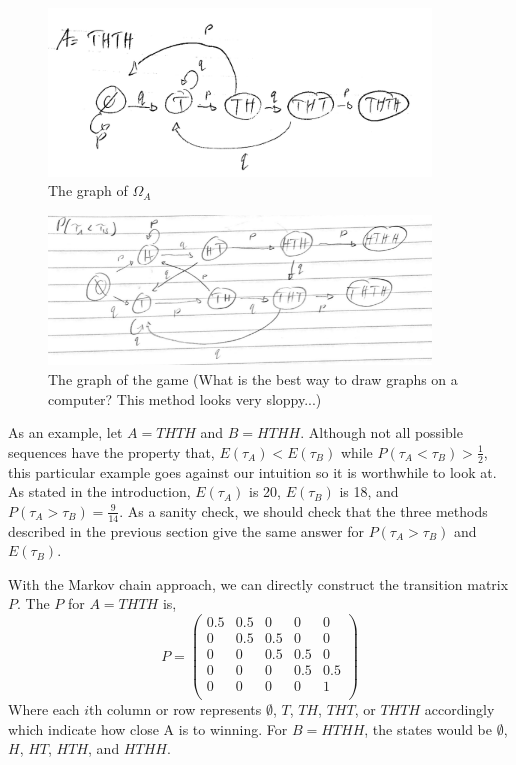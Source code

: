 \documentclass{article}
\numberwithin{mytheorem}{subsection} %
\begin{document}
		\begin{figure}[h]
			\begin{center}
				\includegraphics[width=4.0in]{GameOfA}
			\end{center}
		
			\caption{The graph of $\Omega_A$}
			\label{perfect_fig}
		\end{figure}
		\begin{figure}[h]
			\begin{center}
				\includegraphics[width=4.0in]{winning}
			\end{center}
		
			\caption{The graph of the game (What is the best way to draw graphs on a computer? This method looks very sloppy...)}
			\label{perfect_fig}
		\end{figure}

		As an example, let $A = THTH$ and $B = HTHH$. Although not all possible sequences have the property that, $E(\tau_A) < E(\tau_B)$ while $P(\tau_A < \tau_B) > \frac{1}{2}$, this particular example goes against our intuition so it is worthwhile to look at. As stated in the introduction, $E(\tau_A)$ is 20, $E(\tau_B)$ is 18, and $P(\tau_A > \tau_B) = \frac{9}{14}$. As a sanity check, we should check that the three methods described in the previous section give the same answer for $P(\tau_A > \tau_B)$ and $E(\tau_B)$. 

		With the Markov chain approach, we can directly construct the transition matrix $P$. The $P$ for $A=THTH$ is,
		\begin{equation} 	
			P= \left(
			\begin{array}{ccccc}
			 0.5 & 0.5 & 0 & 0 & 0 \\
			 0 & 0.5 & 0.5 & 0 & 0 \\
			 0 & 0 & 0.5 & 0.5 & 0 \\
			 0 & 0 & 0 & 0.5 & 0.5 \\
			 0 & 0 & 0 & 0 & 1 \\
			\end{array}
			\right)
		\end{equation}
		Where each $i$th column or row represents $\emptyset$, $T$, $TH$, $THT$, or $THTH$ accordingly which indicate how close A is to winning. For $B = HTHH$, the states would be $\emptyset$, $H$, $HT$, $HTH$, and $HTHH$.
\end{document}
